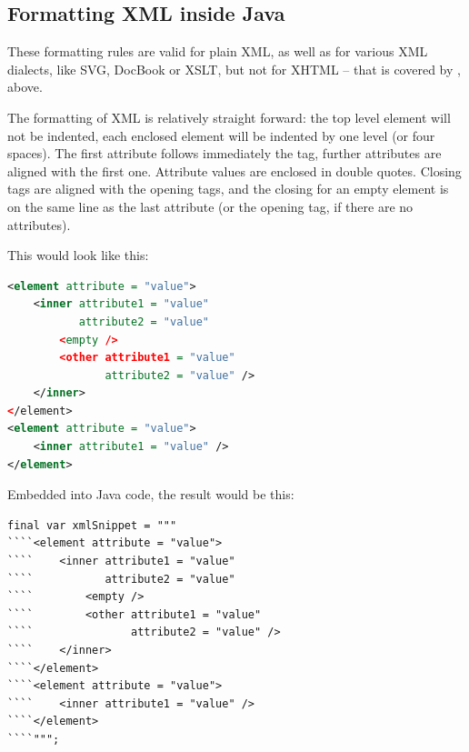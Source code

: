 \subsection{Formatting XML inside Java}\label{sec:FormattingXMLInsideJava}
These formatting rules are valid for plain XML, as well as for various XML dialects, like SVG, DocBook or XSLT, but not for XHTML – that is covered by , above.

The formatting of XML is relatively straight forward: the top level element will not be indented, each enclosed element will be indented by one level (or four spaces). The first attribute follows immediately the tag, further attributes are aligned with the first one. Attribute values are enclosed in double quotes. Closing tags are aligned with the opening tags, and the closing \bdq{\lstinline| />|} for an empty element is on the same line as the last attribute (or the opening tag, if there are no attributes).

This would look like this:
\begin{lstlisting}[language=XML]
<element attribute = "value">
    <inner attribute1 = "value"
           attribute2 = "value"
        <empty />
        <other attribute1 = "value"
               attribute2 = "value" />
    </inner>
</element>
<element attribute = "value">
    <inner attribute1 = "value" />
</element>
\end{lstlisting}

Embedded into Java code, the result would be this:
\begin{lstlisting}
final var xmlSnippet = """
````<element attribute = "value">
````    <inner attribute1 = "value"
````           attribute2 = "value"
````        <empty />
````        <other attribute1 = "value"
````               attribute2 = "value" />
````    </inner>
````</element>
````<element attribute = "value">
````    <inner attribute1 = "value" />
````</element>
````""";
\end{lstlisting}

